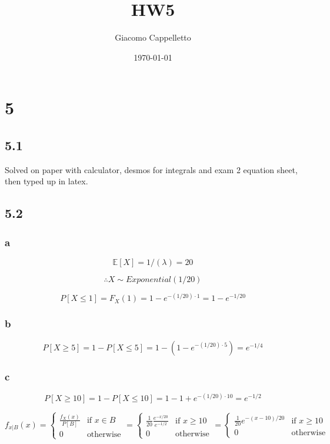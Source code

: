 \documentclass{article}
\title{HW5}
\author{Giacomo Cappelletto}
\date{\today}
\begin{document}
\maketitle

\section*{5}
\subsection*{5.1}
Solved on paper with calculator, desmos for integrals and exam 2 equation sheet, then typed up in latex.
\subsection*{5.2}
\subsubsection*{a}


$$ \mathbb{E}[X] = 1/(\lambda) = 20 $$

$$ \therefore X \sim Exponential(1/20) $$

$$ P[X \leq 1] = F_X(1) = 1 - e^{- (1/20) \cdot 1} = 1 - e^{-1/20} $$


\subsubsection*{b}

$$ P[X \geq 5 ] = 1 - P[X \leq 5] = 1 - (1 - e^{- (1/20) \cdot 5}) = e^{-1/4} $$

\subsubsection*{c}

$$ P[X \geq 10] = 1 - P[X \leq 10] = 1 - 1 + e^{- (1/20) \cdot 10} = e^{-1/2} $$

\[
	f_{x|B}(x) =
	\begin{cases}
		\frac{f_X(x)}{P[B]} & \text{if } x \in B \\
		0                   & \text{otherwise}
	\end{cases}
	=
	\begin{cases}
		\frac{1}{20} \frac{e^{-x/20}}{e^{-1/2}} & \text{if } x \geq 10 \\
		0                                       & \text{otherwise}
	\end{cases}
	=
	\begin{cases}
		\frac{1}{20} e^{-(x-10)/20} & \text{if } x \geq 10 \\
		0                           & \text{otherwise}
	\end{cases}
\]
\end{document}
